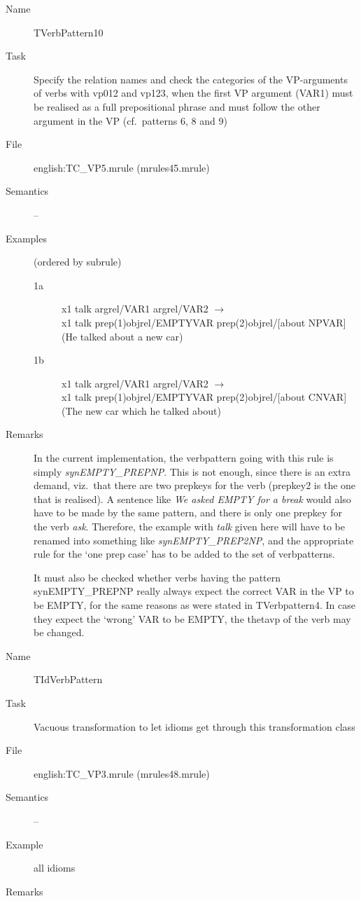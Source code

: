 \begin{description}
\vspace{1 cm}
\begin{description}
\item[Name] TVerbPattern10
\item[Task] Specify the relation names and check the categories of the VP-arguments 
of verbs with vp012 and vp123, when the first VP argument (VAR1) must be realised 
as a full prepositional 
phrase and must follow the other argument in the VP (cf.\ patterns 6, 8 and 9)
\item[File] english:TC\_VP5.mrule (mrules45.mrule)
\item[Semantics] --
\item[Examples] (ordered by subrule)
   \begin{description}
  \item[1a] x1 talk argrel/VAR1 argrel/VAR2 $\rightarrow$ \\
x1 talk    prep(1)objrel/EMPTYVAR prep(2)objrel/[about NPVAR] \\
(He talked about a new car)
  \item[1b] x1 talk argrel/VAR1 argrel/VAR2 $\rightarrow$ \\
x1 talk    prep(1)objrel/EMPTYVAR prep(2)objrel/[about CNVAR] \\
(The new car which he talked about)
   \end{description}
\item[Remarks] In the current implementation, the verbpattern going with this 
rule is simply {\em synEMPTY\_PREPNP\/}. This is not enough, since there is an 
extra demand, viz.\ that there are two prepkeys for the verb (prepkey2 is the 
one that is realised). A sentence like {\em We asked EMPTY for a break\/} 
would also have to be made by the same pattern, and there is only one prepkey 
for the verb {\em ask\/}. Therefore, the example with {\em talk\/} given here 
will have to be renamed into something like {\em synEMPTY\_PREP2NP\/}, and the 
appropriate rule for the `one prep case' has to be added to the set of 
verbpatterns.

It must also be checked whether verbs 
having the pattern synEMPTY\_PREPNP really always expect the correct VAR in the 
VP to be EMPTY, for the same reasons as were stated in TVerbpattern4. In case 
they expect the `wrong' VAR to be EMPTY, the thetavp of the verb may be 
changed.

\end{description}

\vspace{1 cm}
\begin{description}
\item[Name] TIdVerbPattern
\item[Task] Vacuous transformation to let idioms get through this 
transformation class
\item[File] english:TC\_VP3.mrule (mrules48.mrule)
\item[Semantics] --
\item[Example] all idioms
\item[Remarks]
\end{description}

\end{description}

